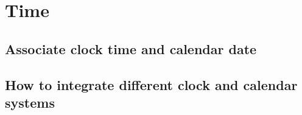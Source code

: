 \chapter{Time}

\section{Associate clock time and calendar date}


\section{How to integrate different clock and calendar systems}